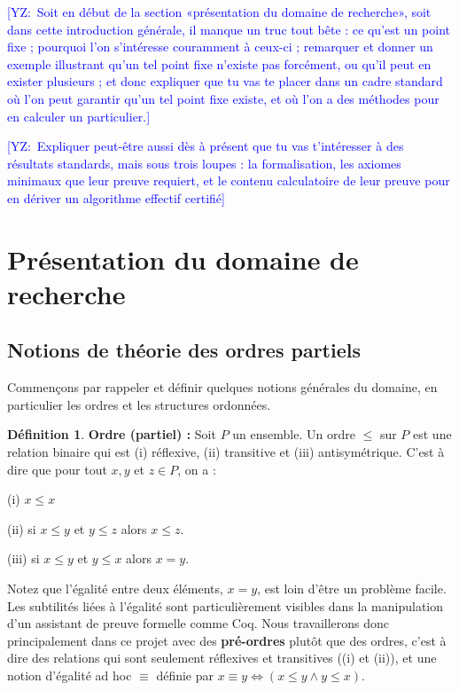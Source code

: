 \documentclass{article}
\newcommand{\yz}[1]{\textcolor{blue}{{[YZ:~#1]}}}
\theoremstyle{definition}
\newtheorem{definition}{Définition}[section]
\begin{document}
\yz{Soit en début de la section «présentation du domaine de recherche», soit
  dans cette \og introduction \fg générale, il manque un truc tout bête : ce
  qu'est un point fixe ; pourquoi l'on s'intéresse couramment à ceux-ci ;
  remarquer et donner un exemple illustrant qu'un tel point fixe n'existe pas
  forcément, ou qu'il peut en exister plusieurs ; et donc expliquer que tu vas
  te placer dans un cadre standard où l'on peut garantir qu'un tel point fixe
  existe, et où l'on a des méthodes pour en calculer un particulier.}

\yz{Expliquer peut-être aussi dès à présent que tu vas t'intéresser à des résultats standards,
mais sous trois loupes : la formalisation, les axiomes minimaux que leur preuve
requiert, et le contenu calculatoire de leur preuve pour en dériver un
algorithme effectif certifié}

\tableofcontents

\section{Présentation du domaine de recherche}


\subsection{Notions de théorie des ordres partiels}

Commençons par rappeler et définir quelques notions générales du domaine, en particulier les ordres et les structures ordonnées.

\begin{definition}{\textbf{Ordre (partiel) : }}
Soit $P$ un ensemble. Un ordre $\leq$ sur $P$ est une relation binaire qui est (i) réflexive, (ii) transitive et (iii) antisymétrique. C'est à dire que pour tout $x, y$ et $z \in P$, on a :

(i) $x \leq x$

(ii) si $x \leq y$ et $y \leq z$ alors $x \leq z$.

(iii) si $x \leq y$ et $y \leq x$ alors $x = y$.
\end{definition}

Notez que l'égalité entre deux éléments, $x = y$, est loin d'être un problème facile. Les subtilités liées à l'égalité sont particulièrement visibles dans la manipulation d'un assistant de preuve formelle comme Coq. Nous travaillerons donc principalement dans ce projet avec des \textbf{pré-ordres} plutôt que des ordres, c'est à dire des relations qui sont seulement réflexives et transitives ((i) et (ii)), et une notion d'égalité ad hoc $\equiv$ définie par $x \equiv y \Longleftrightarrow (x \leq y \wedge y \leq x)$.
\end{document}
